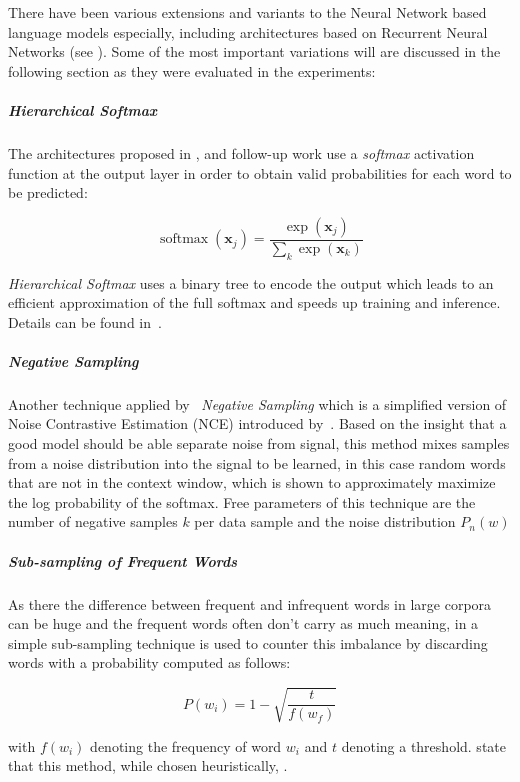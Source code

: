 There have been various extensions and variants to the Neural Network based language models especially, including architectures based on Recurrent Neural Networks (see \cite{Mikolov:2012aa}). Some of the most important variations will are discussed in the following section as they were evaluated in the experiments:

\subparagraph{Hierarchical Softmax}
The architectures proposed in \cite{Bengio:2000aa}, \cite{bengio2003neural} and follow-up work use a \emph{softmax} activation function at the output layer in order to obtain valid probabilities for each word to be predicted:

\begin{equation}
  \operatorname{softmax}(\mathbf{x}_j) = \frac{\exp(\mathbf{x}_j)}{\sum_k \exp(\mathbf{x}_k)}
\end{equation}

\emph{Hierarchical Softmax} uses a binary tree to encode the output which leads to an efficient approximation of the full softmax and speeds up training and inference. Details can be found in~\cite{Mikolov:2013ab}.

\subparagraph{Negative Sampling}
Another technique applied by~\cite{Mikolov:2013ab} \emph{Negative Sampling} which is a simplified version of Noise Contrastive Estimation (NCE) introduced by~\cite{Gutmann:2012aa}. Based on the insight that a good model should be able separate noise from signal, this method mixes samples from a noise distribution into the signal to be learned, in this case random words that are not in the context window, which is shown to approximately maximize the log probability of the softmax. Free parameters of this technique are the number of negative samples $k$ per data sample and the noise distribution $P_n(w)$

\subparagraph{Sub-sampling of Frequent Words}
As there the difference between frequent and infrequent words in large corpora can be huge and the frequent words often don't carry as much meaning, in \cite{Mikolov:2013ab} a simple sub-sampling technique is used to counter this imbalance by discarding words with a probability computed as follows:

\begin{equation}
  P(w_i) = 1 - \sqrt{\frac{t}{f(w_f)}}
\end{equation}

with $f(w_i)$ denoting the frequency of word $w_i$ and $t$ denoting a threshold. \cite{Mikolov:2013ab} state that this method, while chosen heuristically, .

